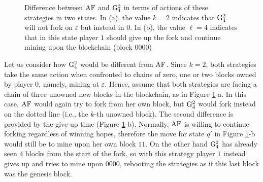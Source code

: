 \begin{figure}
\begin{center}
\end{center}

\caption{Difference between $\text{\rm AF}$ and ${\rm {G}}^2_4$ in terms of actions of these strategies in two states. In (a), the value $k = 2$ indicates that ${\rm {G}}^2_4$ will not 
fork on $\varepsilon$ but instead in $0$. In (b), the value $\ell = 4$ indicates that in this state player $1$ should give up the fork and continue mining upon the blockchain (block $0000$)}
\label{fig-gup}
\end{figure}

\begin{example}
Let us consider how ${\rm {G}}_4^2$ would be different from $\text{\rm AF}$. Since $k = 2$, both strategies take the same action when confronted to chains of zero, one or two blocks owned by player $0$, namely, mining at $\varepsilon$. Hence, assume that both strategies are facing a chain of three unowned new blocks in the blockchain, as in Figure \ref{fig-gup}-a. In this case, $\text{\rm AF}$ would again try to fork from her own block, but ${\rm {G}}_4^2$ would fork instead on the dotted line (i.e., the $k$-th unowned block).
The second difference is provided by the give-up time (Figure \ref{fig-gup}-b). Normally, $\text{\rm AF}$ is willing to continue forking regardless of winning hopes, therefore the move for state $q'$ in Figure \ref{fig-gup}-b would still be to mine upon her own block $11$. On the other hand ${\rm {G}}_4^2$ has already seen $4$ blocks from the start of the fork, so with this strategy player $1$ instead gives up and tries to mine upon $0000$, rebooting the strategies as if this last block was the genesis block. 
\end{example}

